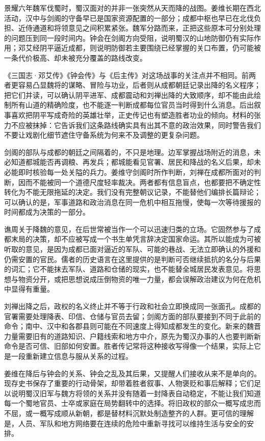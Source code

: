 景耀六年魏军伐蜀时，蜀汉面对的并非一张突然从天而降的战图。姜维长期在西北活动，汉中与剑阁的守备早已是国家资源配置的一部分；成都中枢也早已在北伐负担、近侍通道和将领意见之间积累紧张。魏军分路而来，正把这些原本可分别处理的问题压到同一段时间内。钟会在剑阁方向受阻，说明蜀汉的山地防御仍有实际作用；邓艾经阴平逼近成都，则说明防御若主要围绕已经掌握的关口布置，仍可能被一条代价极高、却未被充分覆盖的路线改变。

《三国志·邓艾传》《钟会传》与《后主传》对这场战事的关注点并不相同。前两者更容易凸显魏将的谋略、冒险与功业，后者则从成都朝廷记录出降的名义程序；把它们并读，可以确认阴平进军、成都震动和刘禅出降的大致顺序，却不能由此绘制所有山道的精确险度，也不能逐一判断成都每位官员当时得到什么消息。后出叙事喜欢把阴平写成奇险的英雄壮举，正史传记也有塑造胜者功业的倾向。材料的张力不应被抹掉：它告诉我们这条路线确实具有出其不意的政治效果，同时警告我们不要让戏剧化细节遮住守备系统为何来不及调整的更复杂问题。

剑阁的部队与成都的朝廷之间隔着的，不只是地理。边军掌握战场附近的消息，未必知道都城能否再调粮、再发兵；都城能看见官署、居民和降战的名义后果，却未必能即时核验每一处关隘的兵力。姜维守剑阁时所作判断，刘禅在成都所面对的判断，因而不能被同一个道德尺度轻率裁决。两者都有信息盲点，也都要把不确定性转化为不能无限拖延的决定。我们没有完整朝议记录，不能替他们编排长篇辩论；可以确认的是，军事道路和政治消息在同一危机中相互拖慢，使每一次等待援报的时间都成为决策的一部分。

谯周关于降魏的意见，在后世常被当作一个可以迅速归类的立场。它固然参与了成都末局的决策，却不应被写成一个书生单凭言辞决定国家命运。其所以能成为可被听取的意见，是因为成都已面对逼近的军队、可能的巷战、无法立即确认的外援和仍需安置的官民。儒者的历史语言在这里提供的是判断可否继续抵抗的名分与后果的词汇；它不能抹去军队、道路和仓储的现实，也不能替全城居民发表意见。将思想与物资分开，或把思想说成压倒物资的唯一力量，都会误解政治建议为何在危机中显得有重量。

刘禅出降之后，政权的名义终止并不等于行政和社会立即换成同一张面孔。成都的官署需要处理降表、印信、仓储与官员去留；剑阁方面的部队要接到不同于此前的命令；南中、汉中和各郡县则可能在不同速度上得知成都发生的变化。新来的魏晋力量需要旧有的道路知识、户籍线索和地方中介，原先为蜀汉办事的人也要判断新命令是否可信、旧部如何安置。胜者传记常将这种接收写得像一个结果，实际上它是一段重新建立信息与服从关系的过程。

姜维在降后与钟会的关系、钟会之乱及其后果，又提醒人们接收从来不是单向的。现存史书保存了重要的行动骨架，却带着胜者叙事、人物褒贬和事后解释；它们足以说明蜀汉旧军与魏方将领的关系并没有随着一封降表自动稳定，不能让我们知道每一个蜀地官员、士卒或家庭在局势翻转中的选择。将旧政权的部众一概写成忠而不屈，或一概写成顺从新朝，都是替材料沉默处制造整齐的人群。更可信的理解是，人员、军队和地方网络要在连续的危险中重新寻找可以维持生活与安全的安排。

